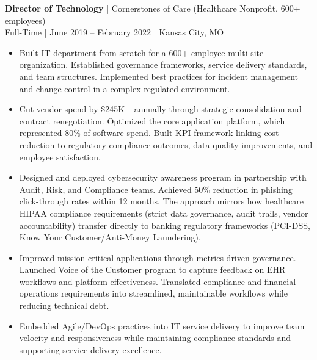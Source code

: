\documentclass[10pt]{article}
\begin{document}
\noindent
\textbf{Director of Technology} | Cornerstones of Care (Healthcare Nonprofit, 600+ employees)\\
Full-Time | June 2019 – February 2022 | Kansas City, MO
\begin{itemize}
  \setlength\itemsep{0.05in}
  \item Built IT department from scratch for a 600+ employee multi-site organization. Established governance frameworks, service delivery standards, and team structures. Implemented best practices for incident management and change control in a complex regulated environment.

  \item Cut vendor spend by \$245K+ annually through strategic consolidation and contract renegotiation. Optimized the core application platform, which represented 80\% of software spend. Built KPI framework linking cost reduction to regulatory compliance outcomes, data quality improvements, and employee satisfaction.

  \item Designed and deployed cybersecurity awareness program in partnership with Audit, Risk, and Compliance teams. Achieved 50\% reduction in phishing click-through rates within 12 months. The approach mirrors how healthcare HIPAA compliance requirements (strict data governance, audit trails, vendor accountability) transfer directly to banking regulatory frameworks (PCI-DSS, Know Your Customer/Anti-Money Laundering).

  \item Improved mission-critical applications through metrics-driven governance. Launched Voice of the Customer program to capture feedback on EHR workflows and platform effectiveness. Translated compliance and financial operations requirements into streamlined, maintainable workflows while reducing technical debt.

  \item Embedded Agile/DevOps practices into IT service delivery to improve team velocity and responsiveness while maintaining compliance standards and supporting service delivery excellence.
\end{itemize}
\end{document}

